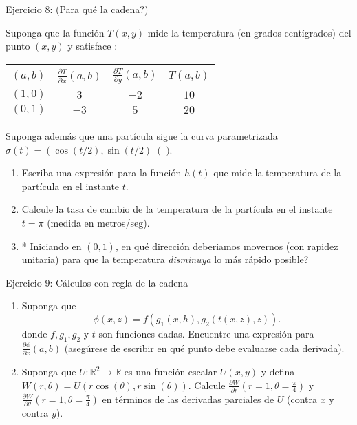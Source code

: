 \documentclass{beamer}
\begin{document}
\begin{frame}{Ejercicio 8: (Para qu\'e la cadena?) } 

Suponga que la funci\'on $T(x,y)$ mide la temperatura (en grados cent\'igrados) del punto $(x,y)$ y satisface :


\begin{center}
\begin{tabular}{ c | c | c | c}
$(a,b)$ & $\frac{\partial T}{\partial x}(a,b)$ & $\frac{\partial T}{\partial y}(a,b)$ & $T(a,b)$\\ 
\hline
$(1,0)$ & $3$ & $-2$ & $10$\\
$(0,1)$ & $-3$ & $5$ & $20$\\
\end{tabular}
\end{center}

Suponga adem\'as que una part\'icula sigue la curva parametrizada $\sigma(t)=\left(\cos(t/2),\sin(t/2)\right()$. 

\begin{enumerate}
\item Escriba una expresi\'on para la funci\'on $h(t)$ que mide la temperatura de la part\'icula en el instante $t$.

\item Calcule la tasa de cambio de la temperatura de la part\'icula en el instante $t=\pi$ (medida en metros/seg).

\item * Iniciando en $(0,1)$, en qu\'e direcci\'on deberiamos movernos (con rapidez unitaria) para que la temperatura {\it disminuya} lo m\'as r\'apido posible?

\end{enumerate}


\end{frame}

\begin{frame}{Ejercicio 9: C\'alculos con regla de la cadena}


\begin{enumerate}
\item Suponga que 
\[\phi(x,z) = f(g_1(x,h),g_2(t(x,z),z)).\]
donde $f,g_1,g_2$ y $t$ son funciones dadas.
Encuentre una expresi\'on para 
$\frac{\partial \phi}{\partial x}(a,b)$
(aseg\'urese de escribir en qu\'e punto debe evaluarse cada derivada).
\item Suponga que $U:\mathbb{R}^2\rightarrow \mathbb{R}$ es una funci\'on escalar $U(x,y)$ y defina $W(r,\theta)=U\left(r\cos(\theta), r\sin(\theta)\right)$. Calcule $\frac{\partial W}{\partial r}(r=1,\theta=\frac{\pi}{4})$ y $\frac{\partial W}{\partial \theta}(r=1,\theta=\frac{\pi}{4})$ en t\'erminos de las derivadas parciales de $U$ (contra $x$ y contra $y$).
\end{enumerate}


\end{frame}
\end{document}
